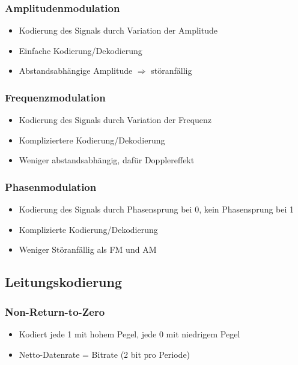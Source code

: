 \documentclass[a4paper]{article}
\begin{document}
\subsubsection{Amplitudenmodulation}
\begin{itemize}
    \item Kodierung des Signals durch Variation der Amplitude
    \item Einfache Kodierung/Dekodierung
    \item Abstandsabhängige Amplitude $\Rightarrow$ störanfällig
\end{itemize}

\subsubsection{Frequenzmodulation}
\begin{itemize}
    \item Kodierung des Signals durch Variation der Frequenz
    \item Kompliziertere Kodierung/Dekodierung
    \item Weniger abstandsabhängig, dafür Dopplereffekt
\end{itemize}

\subsubsection{Phasenmodulation}
\begin{itemize}
    \item Kodierung des Signals durch Phasensprung bei 0, kein Phasensprung bei 1
    \item Komplizierte Kodierung/Dekodierung
    \item Weniger Störanfällig als FM und AM
\end{itemize}

\subsection{Leitungskodierung}
\subsubsection{Non-Return-to-Zero}
\begin{itemize}
    \item Kodiert jede 1 mit hohem Pegel, jede 0 mit niedrigem Pegel
    \item Netto-Datenrate = Bitrate (2 bit pro Periode)
\end{itemize}
\end{document}
